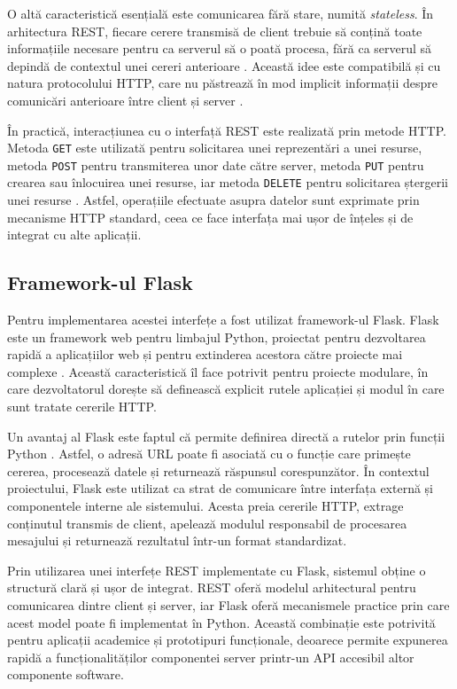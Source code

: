 \documentclass[12pt, a4paper, oneside, romanian]{teza-upb}
\begin{document}
O altă caracteristică esențială este comunicarea fără stare, numită \textit{stateless}. În arhitectura REST, fiecare cerere transmisă de client trebuie să conțină toate informațiile necesare pentru ca serverul să o poată procesa, fără ca serverul să depindă de contextul unei cereri anterioare \cite{fielding_rest}. Această idee este compatibilă și cu natura protocolului HTTP, care nu păstrează în mod implicit informații despre comunicări anterioare între client și server \cite{mdn_http}.

În practică, interacțiunea cu o interfață REST este realizată prin metode HTTP. Metoda \texttt{GET} este utilizată pentru solicitarea unei reprezentări a unei resurse, metoda \texttt{POST} pentru transmiterea unor date către server, metoda \texttt{PUT} pentru crearea sau înlocuirea unei resurse, iar metoda \texttt{DELETE} pentru solicitarea ștergerii unei resurse \cite{mdn_http_methods}. Astfel, operațiile efectuate asupra datelor sunt exprimate prin mecanisme HTTP standard, ceea ce face interfața mai ușor de înțeles și de integrat cu alte aplicații.



\subsection{Framework-ul Flask}


Pentru implementarea acestei interfețe a fost utilizat framework-ul Flask. Flask este un framework web pentru limbajul Python, proiectat pentru dezvoltarea rapidă a aplicațiilor web și pentru extinderea acestora către proiecte mai complexe \cite{flask_doc}. Această caracteristică îl face potrivit pentru proiecte modulare, în care dezvoltatorul dorește să definească explicit rutele aplicației și modul în care sunt tratate cererile HTTP.

Un avantaj al Flask este faptul că permite definirea directă a rutelor prin funcții Python \cite{flask_doc}. Astfel, o adresă URL poate fi asociată cu o funcție care primește cererea, procesează datele și returnează răspunsul corespunzător. În contextul proiectului, Flask este utilizat ca strat de comunicare între interfața externă și componentele interne ale sistemului. Acesta preia cererile HTTP, extrage conținutul transmis de client, apelează modulul responsabil de procesarea mesajului și returnează rezultatul într-un format standardizat.

Prin utilizarea unei interfețe REST implementate cu Flask, sistemul obține o structură clară și ușor de integrat. REST oferă modelul arhitectural pentru comunicarea dintre client și server, iar Flask oferă mecanismele practice prin care acest model poate fi implementat în Python. Această combinație este potrivită pentru aplicații academice și prototipuri funcționale, deoarece permite expunerea rapidă a  funcționalităților componentei server printr-un API accesibil altor componente software.
\end{document}
